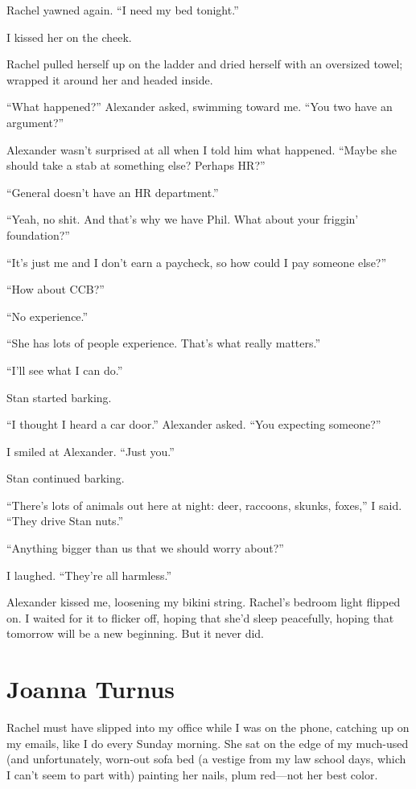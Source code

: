 Rachel yawned again. ``I need my bed tonight.''

I kissed her on the cheek.

Rachel pulled herself up on the ladder and dried herself with an
oversized towel; wrapped it around her and headed inside.

``What happened?'' Alexander asked, swimming toward me. ``You two have
an argument?''

Alexander wasn't surprised at all when I told him what happened. ``Maybe
she should take a stab at something else? Perhaps HR?''

``General doesn't have an HR department.''

``Yeah, no shit. And that's why we have Phil. What about your friggin'
foundation?''

``It's just me and I don't earn a paycheck, so how could I pay someone
else?''

``How about CCB?''

``No experience.''

``She has lots of people experience. That's what really matters.''

``I'll see what I can do.''

Stan started barking.

``I thought I heard a car door.'' Alexander asked. ``You expecting
someone?''

I smiled at Alexander. ``Just you.''

Stan continued barking.

``There's lots of animals out here at night: deer, raccoons, skunks,
foxes,'' I said. ``They drive Stan nuts.''

``Anything bigger than us that we should worry about?''

I laughed. ``They're all harmless.''

Alexander kissed me, loosening my bikini string. Rachel's bedroom light
flipped on. I waited for it to flicker off, hoping that she'd sleep
peacefully, hoping that tomorrow will be a new beginning. But it never
did.

\chapter{Joanna Turnus}

\titlemark

Rachel must have slipped into my office while I was on the phone,
catching up on my emails, like I do every Sunday morning. She sat on the
edge of my much-used (and unfortunately, worn-out sofa bed (a vestige
from my law school days, which I can't seem to part with) painting her
nails, plum red---not her best color.

